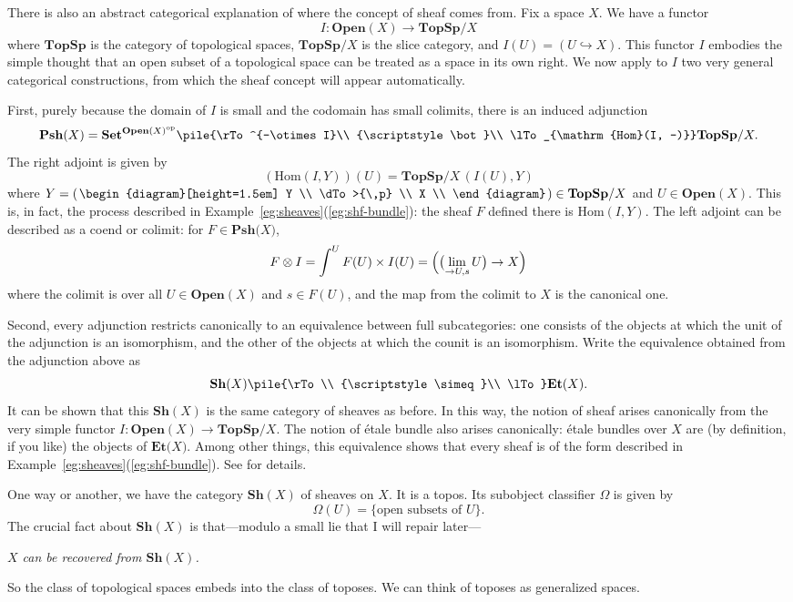 \documentclass[12pt]{article}
\newcommand{\dashbk}{-}
\newcommand{\fcat}[1]{\mathbf{#1}}
\newcommand{\Hom}{\mathrm{Hom}}
\newcommand{\op}{\mathrm{op}}
\newcommand{\Set}{\fcat{Set}}
\newcommand{\vslob}[3]
	{\left.
	\begin{diagram}[height=1.5em]
	#1		\\
	\dTo>{\,#2}	\\
	#3		\\
	\end{diagram}
	\right.}
\newcommand{\eqv}{\simeq}
\newcommand{\Colt}[1]{{\displaystyle\lim_{\rightarrow #1}}\,}
\newcommand{\slogan}[1]{\begin{center}\it #1\end{center}}
\newcommand{\Pshf}[1]{\fcat{Psh}{#1}}
\newcommand{\Sh}{\fcat{Sh}}
\newcommand{\Et}[1]{\fcat{Et}{#1}}
\newcommand{\Open}{\fcat{Open}}
\newcommand{\TopSp}{\fcat{TopSp}}
\newcommand{\incl}{\hookrightarrow}
\newcommand{\dbot}{{\scriptstyle\bot}}
\newcommand{\deqv}{{\scriptstyle\eqv}}
\newcommand{\cln}{\colon}
\begin{document}
There is also an abstract categorical explanation of where the concept of
sheaf comes from.  Fix a space $X$.  We have a functor
\[
I\cln \Open(X) \to \TopSp/X
\]
where $\TopSp$ is the category of topological spaces, $\TopSp/X$ is the slice
category, and $I(U) = (U \incl X)$.  This functor $I$ embodies the simple
thought that an open subset of a topological space can be treated as a space
in its own right.  We now apply to $I$ two very general categorical
constructions, from which the sheaf concept will appear automatically.

First, purely because the domain of $I$ is small and the codomain has small
colimits, there is an induced adjunction
\[
\Pshf(X) = \Set^{\Open(X)^\op}
\pile{\rTo^{\dashbk \otimes I}\\ \dbot\\ \lTo_{\Hom(I, \dashbk)}}
\TopSp/X.
\]
The right adjoint is given by
\[
(\Hom(I, Y))(U)
=
\TopSp/X
\,
(I(U), Y)
\]
where $Y = \left(\vslob{Y}{p}{X}\right) \in \TopSp/X$ and $U \in \Open(X)$.
This is, in fact, the process described in
Example~\ref{eg:sheaves}(\ref{eg:shf-bundle}): the sheaf $F$ defined there is
$\Hom(I, Y)$.  The left adjoint can be described as a coend or colimit: for $F
\in \Pshf(X)$,
\[
F \otimes I     
= 
\int^U F(U) \times I(U) 
=
\Bigl(
\bigl(
\Colt{U, s}
U
\bigr)
\to
X
\Bigr)
\]
where the colimit is over all $U \in \Open(X)$ and $s \in F(U)$, and the
map from the colimit to $X$ is the canonical one.

Second, every adjunction restricts%
\label{p:adjn-eqv}
canonically to an equivalence between full subcategories: one consists of the
objects at which the unit of the adjunction is an isomorphism, and the other
of the objects at which the counit is an isomorphism.  Write the
equivalence obtained from the adjunction above as 
\[
\Sh(X) 
\pile{\rTo\\ \deqv\\ \lTo}
\Et(X).
\]
It can be shown that this $\Sh(X)$ is the same category of sheaves as before.
In this way, the notion of sheaf arises canonically from the very simple
functor $I\cln \Open(X) \to \TopSp/X$.  The notion of \'etale bundle also
arises canonically: \'etale bundles over $X$ are (by definition, if you like)
the objects of $\Et(X)$.  Among other things, this equivalence shows that
every sheaf is of the form described in
Example~\ref{eg:sheaves}(\ref{eg:shf-bundle}).  See \citet{MaMo} for details.

One way or another, we have the category $\Sh(X)$ of sheaves on $X$.  It is a
topos.  Its subobject classifier $\Omega$ is given by
\[
\Omega(U) 
=
\{
\textrm{open subsets of } U
\}.
\]
The crucial fact about $\Sh(X)$ is that---modulo a small lie that I will
repair later---
% 
\slogan{$X$ can be recovered from $\Sh(X)$.}
% 
So the class of topological spaces embeds into the class of toposes.  We can
think of toposes as generalized spaces.
\end{document}
